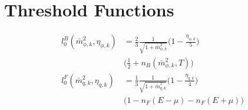\documentclass[%
reprint,
superscriptaddress,
showpacs,preprintnumbers,
 amsmath,amssymb,
 aps,
prd,
]{revtex4-1}
\begin{document}
\appendix

\section{Threshold Functions}
\label{app:threshold_fun}
\begin{align}
	l_0^B(\bar m_{\phi,k}^2,\eta_{\phi,k}) &=\frac{2}{3}\frac{1}{\sqrt{1+\bar m_{\phi,k}^2}} \Big ( 1-\frac{\eta_{\phi,k}}{5}\Big) \nonumber\\[2ex] 
	&\Big( \frac{1}{2}+n_B(\bar m_{\phi,k}^2,T) \Big)  \\[2ex]
	l_0^F(\bar m_{q,k}^2,\eta_{q,k})&=\frac{1}{3} \frac{1}{\sqrt{1+\bar m_{q,k}^2}} \Big(1-\frac{\eta_{q,k}}{4}\Big) \nonumber\\[2ex]
	&\Big(1-n_F(E-\mu)-n_F(E+\mu))
\end{align}


\end{document}
